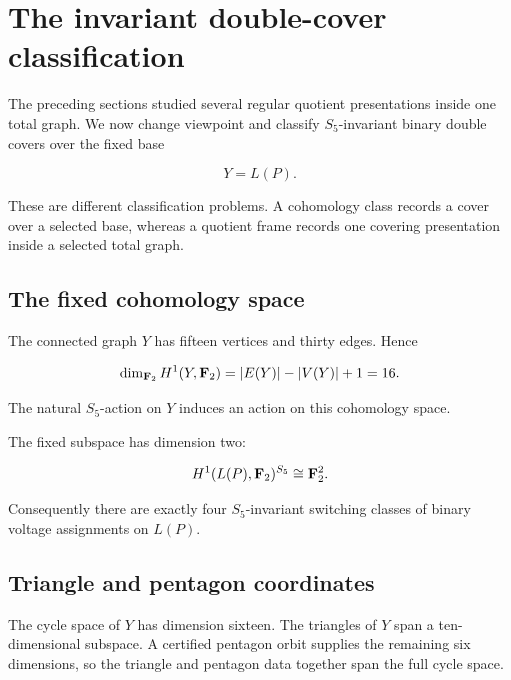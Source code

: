 \section{The invariant double-cover classification}

The preceding sections studied several regular quotient presentations
inside one total graph. We now change viewpoint and classify
\(S_5\)-invariant binary double covers over the fixed base

\[
Y=L(P).
\]

These are different classification problems. A cohomology class records a
cover over a selected base, whereas a quotient frame records one covering
presentation inside a selected total graph.

\subsection{The fixed cohomology space}

The connected graph \(Y\) has fifteen vertices and thirty edges. Hence

\[
\dim_{\mathbf F_2} H^1(Y,\mathbf F_2)
=
|E(Y)|-|V(Y)|+1
=
16.
\]

The natural \(S_5\)-action on \(Y\) induces an action on this cohomology
space.


\begin{theorem}
\label{thm:fixed-cohomology}

The fixed subspace has dimension two:

\[
H^1(L(P),\mathbf F_2)^{S_5}
\cong
\mathbf F_2^2.
\]

Consequently there are exactly four \(S_5\)-invariant switching classes of
binary voltage assignments on \(L(P)\).
\end{theorem}

\subsection{Triangle and pentagon coordinates}

The cycle space of \(Y\) has dimension sixteen. The triangles of \(Y\)
span a ten-dimensional subspace. A certified pentagon orbit supplies the
remaining six dimensions, so the triangle and pentagon data together span
the full cycle space.



